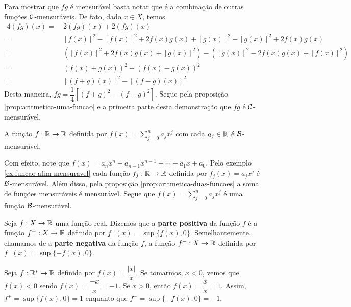 \begin{prova}
    Para mostrar que $fg$ é mensurável basta notar que é a combinação de outras funções $\operatorname{\mathcal{C}}$-mensuráveis.
    De fato, dado $x \in X$, temos
	    \begin{align*}
	        4(fg)(x) 
	        =& \ 2(fg)(x) +  2(fg)(x)\\
	        =& \ [f(x)]^2 - [f(x)]^2 + 2f(x)g(x) + [g(x)]^2 - [g(x)]^2 + 2f(x)g(x)\\
	        =& \ \left([f(x)]^2 + 2f(x)g(x) + [g(x)]^2\right)  - \left([g(x)]^2 - 2f(x)g(x) + [f(x)]^2\right)\\
	        =& \ (f(x) +g(x))^2 - (f(x) - g(x))^2\\
	        =& \ [(f+g)(x)]^2 - [(f-g)(x)]^2
	    \end{align*}
    Desta maneira, $fg = \dfrac{1}{4}\left[(f+g)^2 - (f-g)^2\right]$. Segue pela proposição \ref{prop:aritmetica-uma-funcao} e a primeira parte desta demonstração que $fg$ é $\operatorname{\mathcal{C}}$-mensurável.
\end{prova}

\begin{example}
\label{ex:funcao-polinomial-mensuravel}
    A função  $f:\mathbb{R} \to \mathbb{R}$ definida por $f(x) = \displaystyle \sum_{j = 0}^n a_jx^j$ com cada $a_j \in \mathbb{R}$ é $\operatorname{\mathcal{B}}$-mensurável.
\end{example}
   
    Com efeito, note que  $f(x) = a_nx^n + a_{n-1}x^{n-1} + \cdots + a_1x +a_0$.
	Pelo exemplo \ref{ex:funcao-afim-mensuravel} cada função $f_j:\mathbb{R} \to \mathbb{R}$ definida por  $f_j(x) = a_jx^j$ é $\operatorname{\mathcal{B}}$-mensurável.
	Além disso, pela proposição \ref{prop:aritmetica-duas-funcoes} a soma de funções mensuráveis é mensurável.
	Segue que $f(x) = \displaystyle\sum_{j = 0}^n a_jx^j$ é uma função $\operatorname{\mathcal{B}}$-mensurável.

\begin{definition}
    Seja $f: X \to \mathbb{R}$ uma função real. Dizemos que a \textbf{parte positiva} da função $f$ é a função $f^+: X \to \mathbb{R}$ definida por $f^+(x) = \sup\{f(x), 0\}$.
    Semelhantemente, chamamos de a \textbf{parte negativa} da função $f$, a função $f^-: X \to \mathbb{R}$ definida por $f^-(x) = \sup\{-f(x), 0\}$.
\end{definition}

\begin{example}
    Seja $f: \mathbb{R}^* \to \mathbb{R}$ definida por $f(x) =\dfrac{|x|}{x}$. Se tomarmos, $x< 0$, vemos que $f(x) < 0$ sendo $f(x) = \dfrac{-x}{x} = -1$.
    Se $x>0$, então $f(x) =\dfrac{x}{x} = 1$. Assim, $f^+ = \sup\{f(x), 0\} = 1$ enquanto que $f^- = \sup\{-f(x), 0\} = -1$.
\end{example}

